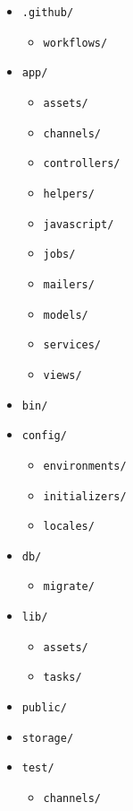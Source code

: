 \begin{itemize}
    \item \texttt{.github/}
    \begin{itemize}
        \item \texttt{workflows/}
    \end{itemize}
    \item \texttt{app/}
    \begin{itemize}
        \item \texttt{assets/}
        \item \texttt{channels/}
        \item \texttt{controllers/}
        \item \texttt{helpers/}
        \item \texttt{javascript/}
        \item \texttt{jobs/}
        \item \texttt{mailers/}
        \item \texttt{models/}
        \item \texttt{services/}
        \item \texttt{views/}
    \end{itemize}
    \item \texttt{bin/}
    \item \texttt{config/}
    \begin{itemize}
        \item \texttt{environments/}
        \item \texttt{initializers/}
        \item \texttt{locales/}
    \end{itemize}
    \item \texttt{db/}
    \begin{itemize}
        \item \texttt{migrate/}
    \end{itemize}
    \item \texttt{lib/}
    \begin{itemize}
        \item \texttt{assets/}
        \item \texttt{tasks/}
    \end{itemize}
    \item \texttt{public/}
    \item \texttt{storage/}
    \item \texttt{test/}
    \begin{itemize}
        \item \texttt{channels/}

\end{itemize}
\end{itemize}
